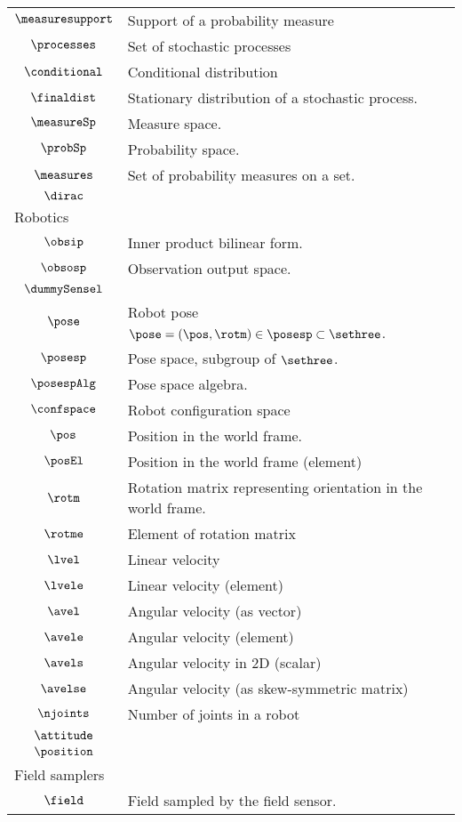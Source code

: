 \begin{longtable}{cl}
 $\measuresupport$ &  Support of a probability measure\\ 
 $\processes$ &  Set of stochastic processes\\ 
 $\conditional$ &  Conditional distribution\\ 
 $\finaldist$ &  Stationary distribution of a stochastic process.\\ 
 $\measureSp$ &  Measure space.\\ 
 $\probSp$ &  Probability space.\\ 
 $\measures$ &  Set of probability measures on a set.\\ 
 $\dirac$ & \\ 
 \multicolumn{2}{l}{Robotics}\\ 
 \hline
$\obsip$ &  Inner product bilinear form.\\ 
 $\obsosp$ &  Observation output space.\\ 
 $\dummySensel$ & \\ 
 $\pose$ &  Robot pose $\pose = (\pos, \rotm) \in \posesp \subset \sethree$.\\ 
 $\posesp$ &  Pose space, subgroup of $\sethree$.\\ 
 $\posespAlg$ &  Pose space algebra.\\ 
 $\confspace$ &  Robot configuration space\\ 
 $\pos$ &  Position in the world frame.\\ 
 $\posEl$ &  Position in the world frame (element)\\ 
 $\rotm$ &  Rotation matrix representing orientation in the world frame.\\ 
 $\rotme$ &  Element of rotation matrix\\ 
 $\lvel$ &  Linear velocity\\ 
 $\lvele$ &  Linear velocity (element)\\ 
 $\avel$ &  Angular velocity (as vector)\\ 
 $\avele$ &  Angular velocity (element)\\ 
 $\avels$ &  Angular velocity in 2D (scalar)\\ 
 $\avelse$ &  Angular velocity (as skew-symmetric matrix)\\ 
 $\njoints$ &  Number of joints in a robot\\ 
 $\attitude$ & \\ 
 $\position$ & \\ 
 \multicolumn{2}{l}{Field samplers}\\ 
 \hline
$\field$ &  Field sampled by the field sensor.\\ 

\end{longtable}
